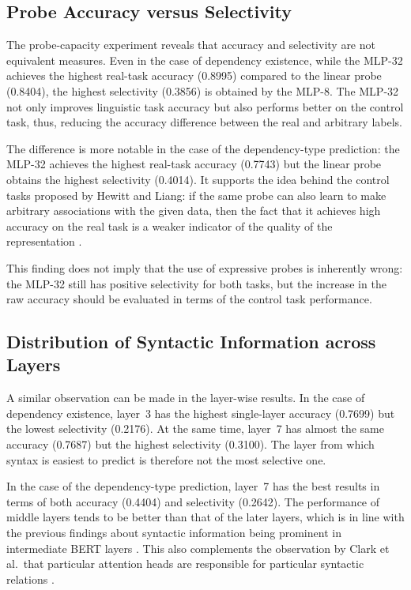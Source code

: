 \documentclass[12pt,a4paper]{article}
\begin{document}
\subsection{Probe Accuracy versus Selectivity}

The probe-capacity experiment reveals that accuracy and selectivity are not equivalent measures. Even in the case of dependency existence,
while the MLP-32 achieves the highest real-task accuracy (0.8995) compared to the linear probe (0.8404), the highest selectivity (0.3856) is obtained by the MLP-8. The MLP-32 not only improves linguistic task accuracy but also performs better on the control task, thus, reducing the accuracy difference between the real and arbitrary labels.

The difference is more notable in the case of the dependency-type prediction: the MLP-32 achieves the highest real-task accuracy (0.7743) but the linear probe obtains the highest selectivity (0.4014). It supports the idea behind the control tasks proposed by Hewitt and Liang: if the same probe can also learn to make arbitrary associations with the given data, then the fact that it achieves high accuracy on the real task is a weaker indicator of the quality of the representation \cite{hewitt2019designing}.

This finding does not imply that the use of expressive probes is inherently wrong: the MLP-32 still has positive selectivity for both tasks, but the increase in the raw accuracy should be evaluated in terms of the control task performance.

\subsection{Distribution of Syntactic Information across Layers}

A similar observation can be made in the layer-wise results. In the case of dependency existence, layer~3 has the highest single-layer accuracy (0.7699) but the lowest selectivity (0.2176). At the same time, layer~7 has almost the same accuracy (0.7687) but the highest selectivity (0.3100). The layer from which syntax is easiest to predict is therefore not the most selective one.

In the case of the dependency-type prediction, layer~7 has the best results in terms of both accuracy (0.4404) and selectivity (0.2642). The performance of middle layers tends to be better than that of the later layers, which is in line with the previous findings about syntactic information being prominent in intermediate BERT layers \cite{tenney2019bert}. This also complements the observation by Clark et al.\ that particular attention heads are responsible for particular syntactic relations \cite{clark2019what}.
\end{document}
